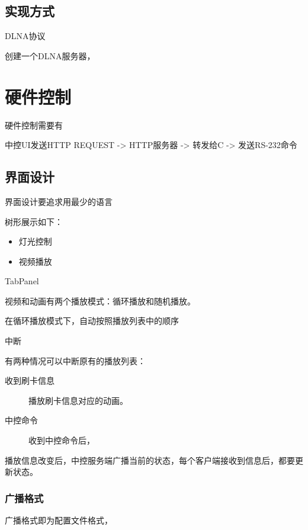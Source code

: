 \section{实现方式}
DLNA协议

创建一个DLNA服务器，

\chapter{硬件控制}
硬件控制需要有

中控UI发送HTTP REQUEST -> HTTP服务器 -> 转发给C -> 发送RS-232命令

\section{界面设计}
界面设计要追求用最少的语言


树形展示如下：
\begin{itemize}
\item 灯光控制\\
\item 视频播放\\
\end{itemize}

TabPanel

视频和动画有两个播放模式：循环播放和随机播放。

在循环播放模式下，自动按照播放列表中的顺序

中断

有两种情况可以中断原有的播放列表：

\begin{description}
\item[收到刷卡信息] 播放刷卡信息对应的动画。
\item[中控命令] 收到中控命令后，
\end{description}


播放信息改变后，中控服务端广播当前的状态，每个客户端接收到信息后，都要更新状态。

\subsection{广播格式}

广播格式即为配置文件格式，